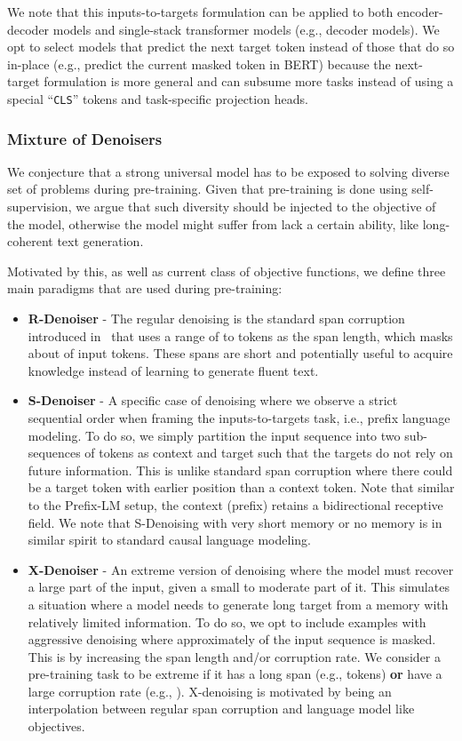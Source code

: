 \documentclass[10pt]{article}
\begin{document}
We note that this inputs-to-targets formulation can be applied to both encoder-decoder models and single-stack transformer models (e.g., decoder models). We opt to select models that predict the next target token instead of those that do so in-place (e.g., predict the current masked token in BERT) because the next-target formulation is more general and can subsume more tasks instead of using a special ``\texttt{CLS}'' tokens and task-specific projection heads.


\subsubsection{Mixture of Denoisers}
We conjecture that a strong universal model has to be exposed to solving diverse set of problems during pre-training. Given that pre-training is done using self-supervision, we argue that such diversity should be injected to the objective of the model, otherwise the model might suffer from lack a certain ability, like long-coherent text generation.  

Motivated by this, as well as current class of objective functions, we define three main paradigms that are used during pre-training:
\begin{itemize}
    \item \textbf{R-Denoiser} - The regular denoising is the standard span corruption introduced in~\citet{raffel2019exploring} that uses a range of  to  tokens as the span length, which masks about  of input tokens. These spans are short and potentially useful to acquire knowledge instead of learning to generate fluent text. 
    \item \textbf{S-Denoiser} - A specific case of denoising where we observe a strict sequential order when framing the inputs-to-targets task, i.e., prefix language modeling. To do so, we simply partition the input sequence into two sub-sequences of tokens as context and target such that the targets do not rely on future information. This is unlike standard span corruption where there could be a target token with earlier position than a context token. Note that similar to the Prefix-LM setup, the context (prefix) retains a bidirectional receptive field. We note that S-Denoising with very short memory or no memory is in similar spirit to standard causal language modeling. 
    \item \textbf{X-Denoiser}  - An extreme version of denoising where the model must recover a large part of the input, given a small to moderate part of it. This simulates a situation where a model needs to generate long target from a memory with relatively limited information. To do so, we opt to include examples with aggressive denoising where approximately  of the input sequence is masked. This is by increasing the span length and/or corruption rate. We consider a pre-training task to be extreme if it has a long span (e.g.,  tokens) \textbf{or} have a large corruption rate (e.g., ). X-denoising is motivated by being an interpolation between regular span corruption and language model like objectives. 
\end{itemize}
\end{document}
